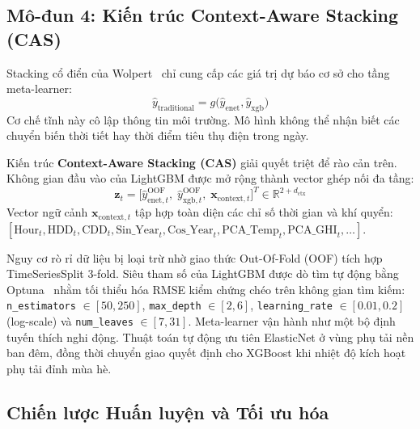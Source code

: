 \subsection{Mô-đun 4: Kiến trúc Context-Aware Stacking (CAS)}
\label{subsec:module4}

Stacking cổ điển của Wolpert~\cite{wolpert1992stacked} chỉ cung cấp các giá trị dự báo cơ sở cho tầng meta-learner:
\begin{equation}
    \hat{y}_{\text{traditional}} = g\big(\hat{y}_{\text{enet}}, \hat{y}_{\text{xgb}}\big)
\end{equation}
Cơ chế tĩnh này cô lập thông tin môi trường. Mô hình không thể nhận biết các chuyển biến thời tiết hay thời điểm tiêu thụ điện trong ngày.

Kiến trúc \textbf{Context-Aware Stacking (CAS)} giải quyết triệt để rào cản trên. Không gian đầu vào của LightGBM được mở rộng thành vector ghép nối đa tầng:
\begin{equation}
    \mathbf{z}_t = \Big[ \hat{y}_{\text{enet}, t}^{\text{OOF}}, \; \hat{y}_{\text{xgb}, t}^{\text{OOF}}, \; \mathbf{x}_{\text{context}, t} \Big]^T \in \mathbb{R}^{2 + d_{\text{ctx}}}
\end{equation}
Vector ngữ cảnh $\mathbf{x}_{\text{context}, t}$ tập hợp toàn diện các chỉ số thời gian và khí quyển: $[\text{Hour}_t, \text{HDD}_t, \text{CDD}_t, \text{Sin\_Year}_t, \text{Cos\_Year}_t, \text{PCA\_Temp}_t, \text{PCA\_GHI}_t, \dots]$.

Nguy cơ rò rỉ dữ liệu bị loại trừ nhờ giao thức Out-Of-Fold (OOF) tích hợp TimeSeriesSplit 3-fold. Siêu tham số của LightGBM được dò tìm tự động bằng Optuna~\cite{akiba2019optuna} nhằm tối thiểu hóa RMSE kiểm chứng chéo trên không gian tìm kiếm: \texttt{n\_estimators} $\in [50, 250]$, \texttt{max\_depth} $\in [2, 6]$, \texttt{learning\_rate} $\in [0.01, 0.2]$ (log-scale) và \texttt{num\_leaves} $\in [7, 31]$. Meta-learner vận hành như một bộ định tuyến thích nghi động. Thuật toán tự động ưu tiên ElasticNet ở vùng phụ tải nền ban đêm, đồng thời chuyển giao quyết định cho XGBoost khi nhiệt độ kích hoạt phụ tải đỉnh mùa hè.

\subsection{Chiến lược Huấn luyện và Tối ưu hóa}
\label{subsec:training}

